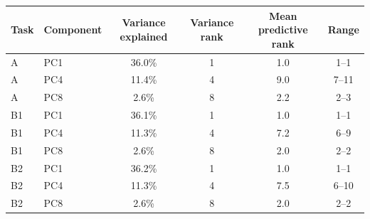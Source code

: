 \begin{tabular}{llcccc}
\toprule
Task & Component & Variance explained & Variance rank & Mean predictive rank & Range \\
\midrule
A & PC1 & 36.0\% & 1 & 1.0 & 1--1 \\
A & PC4 & 11.4\% & 4 & 9.0 & 7--11 \\
A & PC8 & 2.6\% & 8 & 2.2 & 2--3 \\
B1 & PC1 & 36.1\% & 1 & 1.0 & 1--1 \\
B1 & PC4 & 11.3\% & 4 & 7.2 & 6--9 \\
B1 & PC8 & 2.6\% & 8 & 2.0 & 2--2 \\
B2 & PC1 & 36.2\% & 1 & 1.0 & 1--1 \\
B2 & PC4 & 11.3\% & 4 & 7.5 & 6--10 \\
B2 & PC8 & 2.6\% & 8 & 2.0 & 2--2 \\
\bottomrule
\end{tabular}